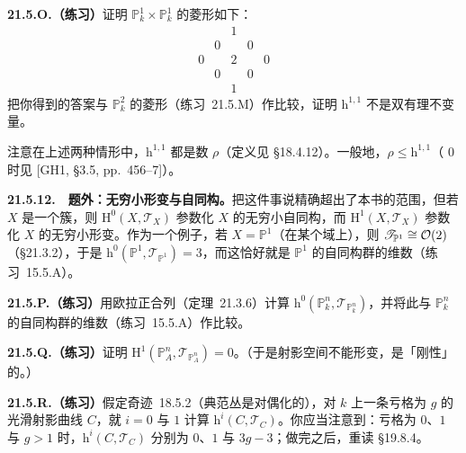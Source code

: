 \textbf{21.5.O.（练习）}\quad 证明 $\mathbb{P}^1_k\times\mathbb{P}^1_k$ 的\trHodge{}菱形如下：
\[
\begin{array}{ccccc}
 & & 1 & & \\
 & 0 & & 0 & \\
 0 & & 2 & & 0 \\
 & 0 & & 0 & \\
 & & 1 & &
\end{array}
\]
把你得到的答案与 $\mathbb{P}^2_k$ 的\trHodge{}菱形（\mbox{练习~21.5.M}）作比较，证明 $\mathrm{h}^{1,1}$ 不是双有理不变量。

注意在上述两种情形中，$\mathrm{h}^{1,1}$ 都是\trPicard{}数 $\rho$（定义见 \S18.4.12）。一般地，$\rho\le\mathrm{h}^{1,1}$（\trCharacteristic{} $0$ 时见 [GH1, \S3.5, pp.~456--7]）。

\textbf{21.5.12.}\ \hard\ \textbf{题外：无穷小形变与自同构。}\quad 把这件事说精确超出了本书的范围，但若 $X$ 是一个簇，则 $\mathrm{H}^0(X,\mathscr{T}_X)$ 参数化 $X$ 的无穷小自同构，而 $\mathrm{H}^1(X,\mathscr{T}_X)$ 参数化 $X$ 的无穷小形变。作为一个例子，若 $X=\mathbb{P}^1$（在某个域上），则 $\mathscr{T}_{\mathbb{P}^1}\cong\mathcal{O}(2)$（\S21.3.2），于是 $\mathrm{h}^0(\mathbb{P}^1,\mathscr{T}_{\mathbb{P}^1})=3$，而这恰好就是 $\mathbb{P}^1$ 的自同构群的维数（\mbox{练习~15.5.A}）。

\textbf{21.5.P.（练习）}\quad 用欧拉正合列（\mbox{定理~21.3.6}）计算 $\mathrm{h}^0(\mathbb{P}^n_k,\mathscr{T}_{\mathbb{P}^n_k})$，并将此与 $\mathbb{P}^n_k$ 的自同构群的维数（\mbox{练习~15.5.A}）作比较。

\textbf{21.5.Q.（练习）}\quad 证明 $\mathrm{H}^1(\mathbb{P}^n_A,\mathscr{T}_{\mathbb{P}^n_A})=0$。（于是射影空间不能形变，是「刚性」的。）

\textbf{21.5.R.（练习）}\quad 假定\mbox{奇迹~18.5.2}（典范丛是\trSerre{}对偶化的），对 $k$ 上一条亏格为 $g$ 的光滑射影\trGeometricallyIrreducible{}曲线 $C$，就 $i=0$ 与 $1$ 计算 $\mathrm{h}^i(C,\mathscr{T}_C)$。你应当注意到：亏格为 $0$、$1$ 与 $g>1$ 时，$\mathrm{h}^i(C,\mathscr{T}_C)$ 分别为 $0$、$1$ 与 $3g-3$；做完之后，重读 \S19.8.4。

